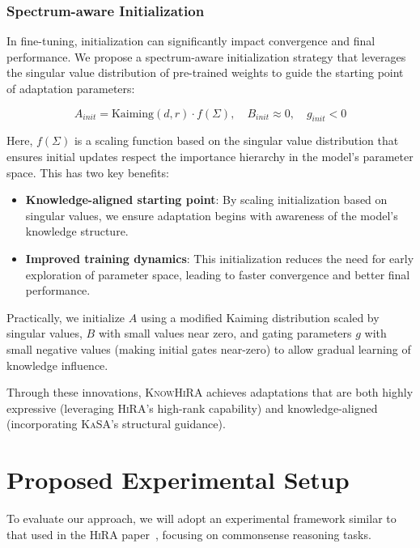 \documentclass[10pt,letterpaper]{article}
\begin{document}
\subsubsection{Spectrum-aware Initialization}

In fine-tuning, initialization can significantly impact convergence and final performance. We propose a spectrum-aware initialization strategy that leverages the singular value distribution of pre-trained weights to guide the starting point of adaptation parameters:

\begin{equation}
    A_{init} = \text{Kaiming}(d, r) \cdot f(\Sigma), \quad B_{init} \approx 0, \quad g_{init} < 0
\end{equation}

Here, $f(\Sigma)$ is a scaling function based on the singular value distribution that ensures initial updates respect the importance hierarchy in the model's parameter space. This has two key benefits:

\begin{itemize}
    \item \textbf{Knowledge-aligned starting point}: By scaling initialization based on singular values, we ensure adaptation begins with awareness of the model's knowledge structure.
    \item \textbf{Improved training dynamics}: This initialization reduces the need for early exploration of parameter space, leading to faster convergence and better final performance.
\end{itemize}

Practically, we initialize $A$ using a modified Kaiming distribution scaled by singular values, $B$ with small values near zero, and gating parameters $g$ with small negative values (making initial gates near-zero) to allow gradual learning of knowledge influence.

Through these innovations, \textsc{KnowHiRA} achieves adaptations that are both highly expressive (leveraging \textsc{HiRA}'s high-rank capability) and knowledge-aligned (incorporating \textsc{KaSA}'s structural guidance).

\section{Proposed Experimental Setup}

To evaluate our approach, we will adopt an experimental framework similar to that used in the \textsc{HiRA} paper~\cite{huang2025hira}, focusing on commonsense reasoning tasks.
\end{document}
